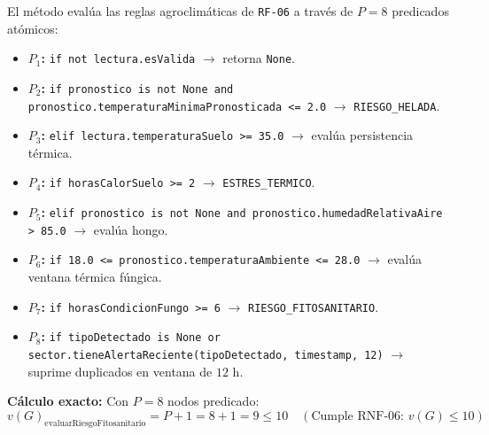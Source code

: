 \documentclass[12pt,letterpaper]{report}
\begin{document}
El método evalúa las reglas agroclimáticas de \texttt{RF-06} a través de $P = 8$ predicados atómicos:
\begin{itemize}
    \item \textbf{$P_1$:} \texttt{if not lectura.esValida} $\rightarrow$ retorna \texttt{None}.
    \item \textbf{$P_2$:} \texttt{if pronostico is not None and pronostico.temperaturaMinimaPronosticada <= 2.0} $\rightarrow$ \texttt{RIESGO\_HELADA}.
    \item \textbf{$P_3$:} \texttt{elif lectura.temperaturaSuelo >= 35.0} $\rightarrow$ evalúa persistencia térmica.
    \item \textbf{$P_4$:} \texttt{if horasCalorSuelo >= 2} $\rightarrow$ \texttt{ESTRES\_TERMICO}.
    \item \textbf{$P_5$:} \texttt{elif pronostico is not None and pronostico.humedadRelativaAire > 85.0} $\rightarrow$ evalúa hongo.
    \item \textbf{$P_6$:} \texttt{if 18.0 <= pronostico.temperaturaAmbiente <= 28.0} $\rightarrow$ evalúa ventana térmica fúngica.
    \item \textbf{$P_7$:} \texttt{if horasCondicionFungo >= 6} $\rightarrow$ \texttt{RIESGO\_FITOSANITARIO}.
    \item \textbf{$P_8$:} \texttt{if tipoDetectado is None or sector.tieneAlertaReciente(tipoDetectado, timestamp, 12)} $\rightarrow$ suprime duplicados en ventana de $12\text{ h}$.
\end{itemize}

\noindent\textbf{Cálculo exacto:} Con $P = 8$ nodos predicado:
\[
    v(G)_{\text{evaluarRiesgoFitosanitario}} = P + 1 = 8 + 1 = 9 \le 10 \quad (\text{Cumple RNF-06: } v(G) \le 10)
\]
\end{document}
